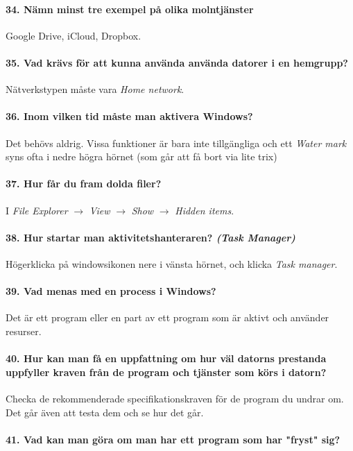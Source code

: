 \paragraph{34. Nämn minst tre exempel på olika molntjänster}
Google Drive, iCloud, Dropbox.

\paragraph{35. Vad krävs för att kunna använda använda datorer i en hemgrupp?}
Nätverkstypen måste vara \textit{Home network}.

\paragraph{36. Inom vilken tid måste man aktivera Windows?}
Det behövs aldrig. Vissa funktioner är bara inte tillgängliga och ett \textit{Water mark} syns ofta i nedre högra hörnet (som går att få bort via lite trix)

\paragraph{37. Hur får du fram dolda filer?}
I \textit{File Explorer} $\rightarrow$ \textit{View} $\rightarrow$ \textit{Show} $\rightarrow$ \textit{Hidden items}.

\paragraph{38. Hur startar man aktivitetshanteraren? \textit{(Task Manager)}}
Högerklicka på windowsikonen nere i vänsta hörnet, och klicka \textit{Task manager}.

\paragraph{39. Vad menas med en process i Windows?}
Det är ett program eller en part av ett program som är aktivt och använder resurser.

\paragraph{40. Hur kan man få en uppfattning om hur väl datorns prestanda uppfyller kraven från de program och tjänster som körs i datorn?}
Checka de rekommenderade specifikationskraven för de program du undrar om. Det går även att testa dem och se hur det går.

\paragraph{41. Vad kan man göra om man har ett program som har "fryst" sig?}

